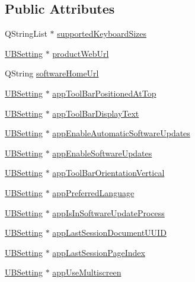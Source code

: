 \subsection*{Public Attributes}
\begin{DoxyCompactItemize}
\item 
Q\-String\-List $\ast$ \hyperlink{class_u_b_settings_a3d9bffe65c4eaa52e30e086ccf77617d}{supported\-Keyboard\-Sizes}
\item 
\hyperlink{class_u_b_setting}{U\-B\-Setting} $\ast$ \hyperlink{class_u_b_settings_aa5b30a6658aa14bfde4232d8ce7a2abc}{product\-Web\-Url}
\item 
Q\-String \hyperlink{class_u_b_settings_abedefc35ccda3678f75ccfdd15d96782}{software\-Home\-Url}
\item 
\hyperlink{class_u_b_setting}{U\-B\-Setting} $\ast$ \hyperlink{class_u_b_settings_a656b93c011fa689b6b7abfa699857145}{app\-Tool\-Bar\-Positioned\-At\-Top}
\item 
\hyperlink{class_u_b_setting}{U\-B\-Setting} $\ast$ \hyperlink{class_u_b_settings_af6b6c89b2d241903e226439882764b0c}{app\-Tool\-Bar\-Display\-Text}
\item 
\hyperlink{class_u_b_setting}{U\-B\-Setting} $\ast$ \hyperlink{class_u_b_settings_ae222117a6ae8b801087888a673a76096}{app\-Enable\-Automatic\-Software\-Updates}
\item 
\hyperlink{class_u_b_setting}{U\-B\-Setting} $\ast$ \hyperlink{class_u_b_settings_ae6e4d32ed202fab1cf82cbb6b0d243c4}{app\-Enable\-Software\-Updates}
\item 
\hyperlink{class_u_b_setting}{U\-B\-Setting} $\ast$ \hyperlink{class_u_b_settings_aee5ac1a9d519a121417130531130b778}{app\-Tool\-Bar\-Orientation\-Vertical}
\item 
\hyperlink{class_u_b_setting}{U\-B\-Setting} $\ast$ \hyperlink{class_u_b_settings_a68816e710a1a3b22a25c9317460d9c17}{app\-Preferred\-Language}
\item 
\hyperlink{class_u_b_setting}{U\-B\-Setting} $\ast$ \hyperlink{class_u_b_settings_a30feb2e7e4c453fd0ef2e4c019fc8995}{app\-Is\-In\-Software\-Update\-Process}
\item 
\hyperlink{class_u_b_setting}{U\-B\-Setting} $\ast$ \hyperlink{class_u_b_settings_ae969ee680f92f3726ccec1dec0f9e2f5}{app\-Last\-Session\-Document\-U\-U\-I\-D}
\item 
\hyperlink{class_u_b_setting}{U\-B\-Setting} $\ast$ \hyperlink{class_u_b_settings_a3d652cedf169318ecb09570f081146f2}{app\-Last\-Session\-Page\-Index}
\item 
\hyperlink{class_u_b_setting}{U\-B\-Setting} $\ast$ \hyperlink{class_u_b_settings_a5ca43f0a662f527bf32637439c602747}{app\-Use\-Multiscreen}

\end{DoxyCompactItemize}
